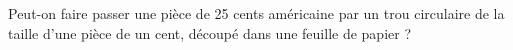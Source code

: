 Peut-on faire passer une pièce de 25 cents américaine par un trou circulaire de la taille d'une pièce de un cent, découpé dans une feuille de papier ?

